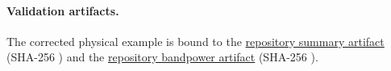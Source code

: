 \documentclass[11pt]{article}
\begin{document}
\paragraph{Validation artifacts.}
The corrected physical example is bound to the
\href{https://github.com/Hubify-Projects/bigbounce/blob/main/reproducibility/p1_namaster_500mc/results/physical_spectrum_v2/summary.json}
{repository summary artifact} (SHA-256
\texttt{})
and the
\href{https://github.com/Hubify-Projects/bigbounce/blob/main/reproducibility/p1_namaster_500mc/results/physical_spectrum_v2/bandpowers.npz}
{repository bandpower artifact} (SHA-256
\texttt{}).

\begin{sloppypar}

\end{sloppypar}
\end{document}
